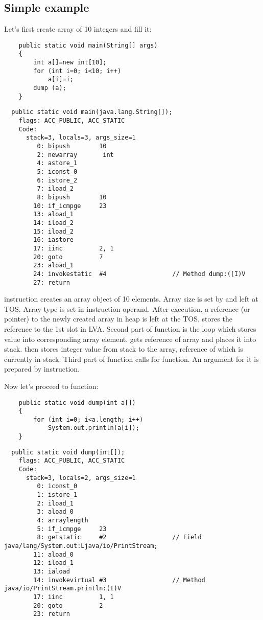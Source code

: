 \subsection{Simple example}

Let's first create array of 10 integers and fill it:

\begin{lstlisting}
	public static void main(String[] args) 
	{
		int a[]=new int[10];
		for (int i=0; i<10; i++)
			a[i]=i;
		dump (a);
	}
\end{lstlisting}

\begin{lstlisting}
  public static void main(java.lang.String[]);
    flags: ACC_PUBLIC, ACC_STATIC
    Code:
      stack=3, locals=3, args_size=1
         0: bipush        10
         2: newarray       int
         4: astore_1      
         5: iconst_0      
         6: istore_2      
         7: iload_2       
         8: bipush        10
        10: if_icmpge     23
        13: aload_1       
        14: iload_2       
        15: iload_2       
        16: iastore       
        17: iinc          2, 1
        20: goto          7
        23: aload_1       
        24: invokestatic  #4                  // Method dump:([I)V
        27: return        
\end{lstlisting}

 instruction creates an array object of 10  elements. 
Array size is set by  and left at \ac{TOS}.
Array type is set in  instruction operand.
After  execution, a reference (or pointer) to the newly created array in heap is left
at the \ac{TOS}.
 stores the reference to the 1st slot in \ac{LVA}.
Second part of  function is the loop which stores  value into corresponding
array element.
 gets reference of array and places it into stack.
 then stores integer value from stack to the array, reference of which is currently in stack.
Third part of  function calls for  function. 
An argument for it is prepared by  instruction.

Now let's proceed to  function:

\begin{lstlisting}
	public static void dump(int a[])
	{
		for (int i=0; i<a.length; i++)
			System.out.println(a[i]);
	}
\end{lstlisting}

\begin{lstlisting}
  public static void dump(int[]);
    flags: ACC_PUBLIC, ACC_STATIC
    Code:
      stack=3, locals=2, args_size=1
         0: iconst_0      
         1: istore_1      
         2: iload_1       
         3: aload_0       
         4: arraylength   
         5: if_icmpge     23
         8: getstatic     #2                  // Field java/lang/System.out:Ljava/io/PrintStream;
        11: aload_0       
        12: iload_1       
        13: iaload        
        14: invokevirtual #3                  // Method java/io/PrintStream.println:(I)V
        17: iinc          1, 1
        20: goto          2
        23: return        
\end{lstlisting}


